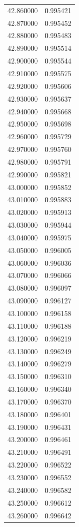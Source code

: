 \begin{tabular}{rr}
42.860000 & 0.995421 \\
42.870000 & 0.995452 \\
42.880000 & 0.995483 \\
42.890000 & 0.995514 \\
42.900000 & 0.995544 \\
42.910000 & 0.995575 \\
42.920000 & 0.995606 \\
42.930000 & 0.995637 \\
42.940000 & 0.995668 \\
42.950000 & 0.995698 \\
42.960000 & 0.995729 \\
42.970000 & 0.995760 \\
42.980000 & 0.995791 \\
42.990000 & 0.995821 \\
43.000000 & 0.995852 \\
43.010000 & 0.995883 \\
43.020000 & 0.995913 \\
43.030000 & 0.995944 \\
43.040000 & 0.995975 \\
43.050000 & 0.996005 \\
43.060000 & 0.996036 \\
43.070000 & 0.996066 \\
43.080000 & 0.996097 \\
43.090000 & 0.996127 \\
43.100000 & 0.996158 \\
43.110000 & 0.996188 \\
43.120000 & 0.996219 \\
43.130000 & 0.996249 \\
43.140000 & 0.996279 \\
43.150000 & 0.996310 \\
43.160000 & 0.996340 \\
43.170000 & 0.996370 \\
43.180000 & 0.996401 \\
43.190000 & 0.996431 \\
43.200000 & 0.996461 \\
43.210000 & 0.996491 \\
43.220000 & 0.996522 \\
43.230000 & 0.996552 \\
43.240000 & 0.996582 \\
43.250000 & 0.996612 \\
43.260000 & 0.996642 \\

\end{tabular}
